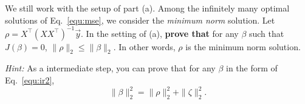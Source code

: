 \item {} We still work with the setup of part (a). Among the infinitely many optimal solutions of Eq.~\eqref{equ:mse}, we consider the \textit{minimum norm} solution. Let $\rho=X^\top (X X^\top)^{-1}\vec{y}$. In the setting of (a), \textbf{prove that} for any $\beta$ such that $J(\beta)=0$, $\|\rho\|_2\le \|\beta\|_2.$ In other words, $\rho$ is the minimum norm solution.

\emph{Hint:} As a intermediate step, you can prove that for any $\beta$ in the form of Eq.~\eqref{equ:ir2}, $$\|\beta\|_2^2=\|\rho\|_2^2+\|\zeta\|_2^2.$$